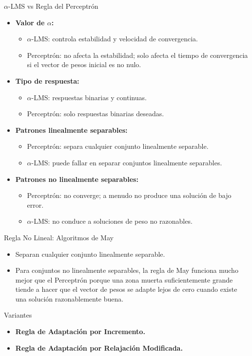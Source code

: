 \documentclass[aspectratio=169,utf8,spanish]{beamer}
\begin{document}
\begin{frame}{$\alpha$-LMS vs Regla del Perceptrón}
  \begin{itemize}
    \item \textbf{Valor de $\alpha$:}
    \begin{itemize}
      \item $\alpha$-LMS: controla estabilidad y velocidad de convergencia.
      \item Perceptrón: no afecta la estabilidad; solo afecta el tiempo de convergencia si el vector de pesos inicial es no nulo.
    \end{itemize}
    \item \textbf{Tipo de respuesta:}
    \begin{itemize}
      \item $\alpha$-LMS: respuestas binarias y continuas.
      \item Perceptrón: solo respuestas binarias deseadas.
    \end{itemize}
    \item \textbf{Patrones linealmente separables:}
    \begin{itemize}
      \item Perceptrón: separa cualquier conjunto linealmente separable.
      \item $\alpha$-LMS: puede fallar en separar conjuntos linealmente separables.
    \end{itemize}
    \item \textbf{Patrones no linealmente separables:}
    \begin{itemize}
      \item Perceptrón: no converge; a menudo no produce una solución de bajo error.
      \item $\alpha$-LMS: no conduce a soluciones de peso no razonables.
    \end{itemize}
  \end{itemize}
\end{frame}

\begin{frame}{Regla No Lineal: Algoritmos de May}
  \begin{itemize}
    \item Separan cualquier conjunto linealmente separable.
    \item Para conjuntos no linealmente separables, la regla de May funciona mucho mejor que el Perceptrón porque una zona muerta suficientemente grande tiende a hacer que el vector de pesos se adapte lejos de cero cuando existe una solución razonablemente buena.
  \end{itemize}

  \begin{block}{Variantes}
    \begin{itemize}
      \item \textbf{Regla de Adaptación por Incremento.}
      \item \textbf{Regla de Adaptación por Relajación Modificada.}
    \end{itemize}
  \end{block}
\end{frame}
\end{document}
